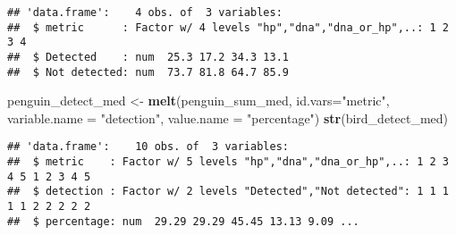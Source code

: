 \documentclass[]{article}
\newenvironment{Shaded}{\begin{snugshade}}{\end{snugshade}}
\newcommand{\KeywordTok}[1]{\textcolor[rgb]{0.13,0.29,0.53}{\textbf{#1}}}
\newcommand{\DataTypeTok}[1]{\textcolor[rgb]{0.13,0.29,0.53}{#1}}
\newcommand{\DecValTok}[1]{\textcolor[rgb]{0.00,0.00,0.81}{#1}}
\newcommand{\StringTok}[1]{\textcolor[rgb]{0.31,0.60,0.02}{#1}}
\newcommand{\CommentTok}[1]{\textcolor[rgb]{0.56,0.35,0.01}{\textit{#1}}}
\newcommand{\OtherTok}[1]{\textcolor[rgb]{0.56,0.35,0.01}{#1}}
\newcommand{\OperatorTok}[1]{\textcolor[rgb]{0.81,0.36,0.00}{\textbf{#1}}}
\newcommand{\NormalTok}[1]{#1}
\begin{document}
\begin{Shaded}
\end{Shaded}

\begin{verbatim}
## 'data.frame':    4 obs. of  3 variables:
##  $ metric      : Factor w/ 4 levels "hp","dna","dna_or_hp",..: 1 2 3 4
##  $ Detected    : num  25.3 17.2 34.3 13.1
##  $ Not detected: num  73.7 81.8 64.7 85.9
\end{verbatim}

\begin{Shaded}
\begin{Highlighting}[]
\NormalTok{penguin_detect_med <-}\StringTok{ }\KeywordTok{melt}\NormalTok{(penguin_sum_med, }\DataTypeTok{id.vars=}\StringTok{"metric"}\NormalTok{, }\DataTypeTok{variable.name =} \StringTok{"detection"}\NormalTok{, }\DataTypeTok{value.name =} \StringTok{"percentage"}\NormalTok{)}
\KeywordTok{str}\NormalTok{(bird_detect_med)}
\end{Highlighting}
\end{Shaded}

\begin{verbatim}
## 'data.frame':    10 obs. of  3 variables:
##  $ metric    : Factor w/ 5 levels "hp","dna","dna_or_hp",..: 1 2 3 4 5 1 2 3 4 5
##  $ detection : Factor w/ 2 levels "Detected","Not detected": 1 1 1 1 1 2 2 2 2 2
##  $ percentage: num  29.29 29.29 45.45 13.13 9.09 ...
\end{verbatim}
\end{document}
